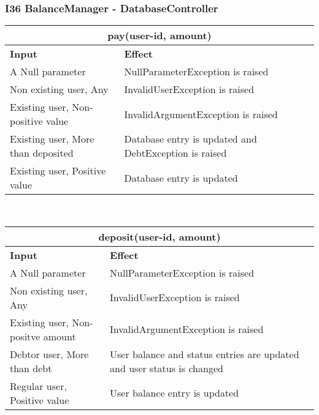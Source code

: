 \subsubsection{I36 BalanceManager - DatabaseController}
\begin{tabular}{|p{5cm}|p{7cm}|}
\hline
\multicolumn{2}{|c|}{pay(user-id, amount)} \\
\hline
\textbf{Input} & \textbf{Effect} \\

\hline
A Null parameter & NullParameterException is raised \\

\hline
Non existing user, Any & InvalidUserException is raised \\

\hline
Existing user, Non-positive value & InvalidArgumentException is raised \\

\hline
Existing user, More than deposited & Database entry is updated and DebtException is raised \\

\hline
Existing user, Positive value & Database entry is updated \\
\hline
\end{tabular}
\\
\begin{tabular}{|p{5cm}|p{7cm}|}
\hline
\multicolumn{2}{|c|}{deposit(user-id, amount)} \\
\hline
\textbf{Input} & \textbf{Effect} \\

\hline
A Null parameter & NullParameterException is raised \\

\hline
Non existing user, Any & InvalidUserException is raised \\

\hline
Existing user, Non-positve amount & InvalidArgumentException is raised \\

\hline
Debtor user, More than debt & User balance and status entries are updated and user status is changed \\

\hline
Regular user, Positive value & User balance entry is updated \\
\hline

\hline
\end{tabular}

